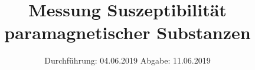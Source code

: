 

\subject{V606}
\title{Messung Suszeptibilität paramagnetischer Substanzen}
\date{%
Durchführung: {04.06.2019}
\hspace{3em}
Abgabe: {11.06.2019}
}



\maketitle
\thispagestyle{empty}
\tableofcontents
\newpage





\printbibliography{}

